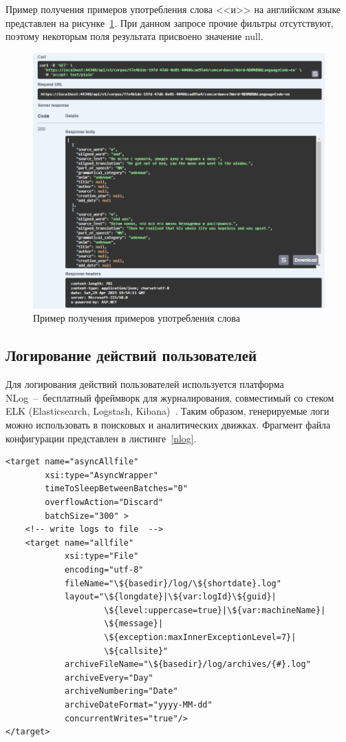 Пример получения примеров употребления слова <<и>> на английском языке представлен на рисунке~\ref{concordance}. При данном запросе прочие фильтры отсутствуют, поэтому некоторым поля результата присвоено значение null.

\captionsetup{singlelinecheck = false, justification=centering}
\begin{figure}[H]
	\centering
	\includegraphics[width=\textwidth]{img/example}
	\caption{Пример получения примеров употребления слова}
	\label{concordance}
\end{figure}

\subsection{Логирование действий пользователей}

Для логирования действий пользователей используется платформа\\ NLog~--~бесплатный фреймворк для журналирования, совместимый со стеком ELK (Elasticsearch, Logstash, Kibana)~\cite{nlog}. Таким образом, генерируемые логи можно использовать в поисковых и аналитических движках. Фрагмент файла конфигурации представлен в листинге~\ref{nlog}.\\

\captionsetup{singlelinecheck = false, justification=raggedright}
\begin{lstlisting}[caption={Фрагмент файла NLog.config}, label=nlog]
<target name="asyncAllfile"
	    xsi:type="AsyncWrapper"
		timeToSleepBetweenBatches="0"
		overflowAction="Discard"
		batchSize="300" >
	<!-- write logs to file  -->
	<target name="allfile"
			xsi:type="File"
			encoding="utf-8"
			fileName="\${basedir}/log/\${shortdate}.log"
			layout="\${longdate}|\${var:logId}\${guid}|
					\${level:uppercase=true}|\${var:machineName}|
					\${message}|
					\${exception:maxInnerExceptionLevel=7}|
					\${callsite}"
			archiveFileName="\${basedir}/log/archives/{#}.log"
			archiveEvery="Day"
			archiveNumbering="Date"
			archiveDateFormat="yyyy-MM-dd"
			concurrentWrites="true"/>
</target>
\end{lstlisting}

